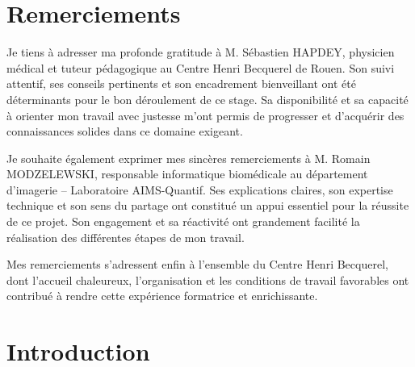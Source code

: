 \documentclass[12pt,a4paper]{report}
\let\oldchapter\chapter
\renewcommand{\chapter}{\clearpage\oldchapter}
\begin{document}


\chapter*{Remerciements}

Je tiens à adresser ma profonde gratitude à M. Sébastien HAPDEY, physicien médical et tuteur pédagogique au Centre Henri Becquerel de Rouen. Son suivi attentif, ses conseils pertinents et son encadrement bienveillant ont été déterminants pour le bon déroulement de ce stage. Sa disponibilité et sa capacité à orienter mon travail avec justesse m'ont permis de progresser et d'acquérir des connaissances solides dans ce domaine exigeant.

Je souhaite également exprimer mes sincères remerciements à M. Romain MODZELEWSKI, responsable informatique biomédicale au département d'imagerie – Laboratoire AIMS-Quantif. Ses explications claires, son expertise technique et son sens du partage ont constitué un appui essentiel pour la réussite de ce projet. Son engagement et sa réactivité ont grandement facilité la réalisation des différentes étapes de mon travail.

Mes remerciements s'adressent enfin à l'ensemble du Centre Henri Becquerel, dont l'accueil chaleureux, l'organisation et les conditions de travail favorables ont contribué à rendre cette expérience formatrice et enrichissante.

\tableofcontents
\newpage

\listoffigures
\newpage

\listoftables
\newpage

\chapter*{Introduction}
\end{document}
